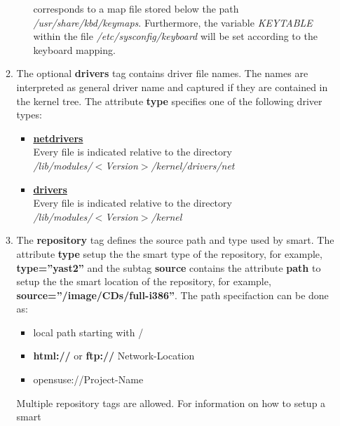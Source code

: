 \begin{itemize}
\begin{enumerate}
\begin{itemize}
                    corresponds to a map file stored below the path
                    \textit{/usr/share/kbd/keymaps}. Furthermore, the variable
                    \textit{KEYTABLE} within the file
                    \textit{/etc/sysconfig/keyboard} will be set according
                    to the keyboard mapping.
          \end{itemize}
          \item The optional \textbf{drivers} tag contains driver file names.
                The names are interpreted as general driver name and captured
                if they are contained in the kernel tree. The attribute
                \textbf{type} specifies one of the following driver types:
                \begin{itemize}
                \item \textbf{\underline{netdrivers}}\\
                      Every file is indicated relative to the directory\\
                      \textit{/lib/modules/$<$Version$>$/kernel/drivers/net}
                \item \textbf{\underline{drivers}}\\
                      Every file is indicated relative to the directory\\
                      \textit{/lib/modules/$<$Version$>$/kernel}
                \end{itemize}
          \item The \textbf{repository} tag defines the source path and
                type used by smart. The attribute \textbf{type} setup the
                the smart type of the repository, for example,
                \textbf{type=''yast2''} and the subtag \textbf{source}
                contains the attribute \textbf{path} to setup the
                the smart location of the repository, for example,
                \textbf{source=''/image/CDs/full-i386''}. The path
                specifaction can be done as:
                \begin{itemize}
                \item local path starting with /
                \item \textbf{html://} or \textbf{ftp://} Network-Location
                \item opensuse://Project-Name
                \end{itemize}
                Multiple repository
                tags are allowed. For information on how to setup a smart

\end{enumerate}
\end{itemize}
